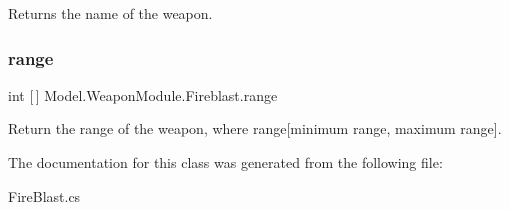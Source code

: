 Returns the name of the weapon. \hypertarget{class_model_1_1_weapon_module_1_1_fireblast_af78d9b434462c20e6946d92db86556dc}{}\label{class_model_1_1_weapon_module_1_1_fireblast_af78d9b434462c20e6946d92db86556dc} 
\subsubsection{\texorpdfstring{range}{range}}
{\footnotesize\ttfamily int \mbox{[}$\,$\mbox{]} Model.\+Weapon\+Module.\+Fireblast.\+range\hspace{0.3cm}{\ttfamily [get]}}

Return the range of the weapon, where range\mbox{[}minimum range, maximum range\mbox{]}. 

The documentation for this class was generated from the following file\+:\begin{DoxyCompactItemize}
\item 
Fire\+Blast.\+cs\end{DoxyCompactItemize}
